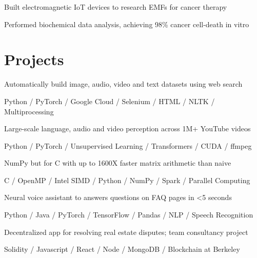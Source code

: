 \documentclass[]{deedy-resume-openfont}
\begin{document}
\begin{minipage}[t]{0.66\textwidth}
\begin{tightemize}
\item Built electromagnetic IoT devices to research EMFs for cancer therapy
\item  Performed biochemical data analysis, achieving 98\% cancer cell-death in vitro
\end{tightemize}
\sectionsep


\section{Projects}
\location{}
\begin{tightemize}
\item Automatically build image, audio, video and text datasets using web search
\item Python / PyTorch / Google Cloud / Selenium / HTML / NLTK / Multiprocessing
\end{tightemize}
\sectionsep

\location{}
\begin{tightemize}
\item Large-scale language, audio and video perception across 1M+ YouTube videos 
\item Python / PyTorch / Unsupervised Learning / Transformers / CUDA / ffmpeg 
\end{tightemize}
\sectionsep

\location{}
\begin{tightemize}
\item NumPy but for C with up to 1600X faster matrix arithmetic than naive
\item C / OpenMP / Intel SIMD / Python / NumPy / Spark / Parallel Computing 
\end{tightemize}
\sectionsep


\location{}
\begin{tightemize}
\item Neural voice assistant to answers questions on FAQ pages in <5 seconds
\item Python / Java / PyTorch / TensorFlow / Pandas / NLP / Speech Recognition 
\end{tightemize}
\sectionsep

\location{}
\begin{tightemize}
\item Decentralized app for resolving real estate disputes; team consultancy project 
\item Solidity / Javascript / React / Node / MongoDB / Blockchain at Berkeley 
\end{tightemize}
\sectionsep



\end{minipage} 
\end{document}

